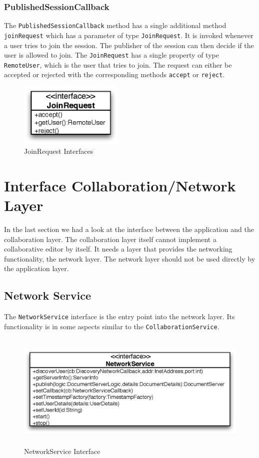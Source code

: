 \subsubsection{PublishedSessionCallback}
The \texttt{PublishedSessionCallback} method has a single additional method
\texttt{joinRequest} which has a parameter of type \texttt{JoinRequest}. It
is invoked whenever a user tries to join the session. The publisher of the
session can then decide if the user is allowed to join. The \texttt{JoinRequest}
has a single property of type \texttt{RemoteUser}, which is the user that 
tries to join. The request can either be accepted or rejected with the 
corresponding methods \texttt{accept} or \texttt{reject}.

\begin{figure}[H]
 \centering
 \includegraphics[width=4.97cm,height=3.03cm]{../images/finalreport/architecture_joinrequest_uml.eps}
 \caption{JoinRequest Interfaces}
\end{figure}



\section{Interface Collaboration/Network Layer}
In the last section we had a look at the interface between the application and
the collaboration layer. The collaboration layer itself cannot implement a
collaborative editor by itself. It needs a layer that provides the networking
functionality, the network layer. The network layer should not be used
directly by the application layer.

\subsection{Network Service}
The \texttt{NetworkService} interface is the entry point into the network layer.
Its functionality is in some aspects similar to the 
\texttt{CollaborationService}. 

\begin{figure}[H]
 \centering
 \includegraphics[width=13.83cm,height=5.57cm]{../images/finalreport/architecture_networkservice_uml.eps}
 \caption{NetworkService Interface}
 \label{fig:archoverview.networkservice}
\end{figure}

